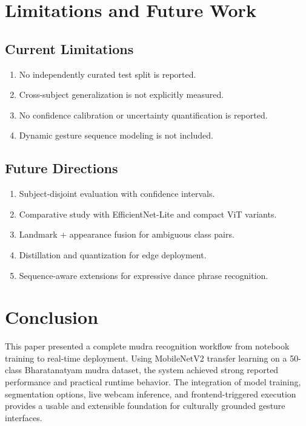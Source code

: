 \documentclass[conference]{IEEEtran}
\begin{document}
\section{Limitations and Future Work}
\subsection{Current Limitations}
\begin{enumerate}
\item No independently curated test split is reported.
\item Cross-subject generalization is not explicitly measured.
\item No confidence calibration or uncertainty quantification is reported.
\item Dynamic gesture sequence modeling is not included.
\end{enumerate}

\subsection{Future Directions}
\begin{enumerate}
\item Subject-disjoint evaluation with confidence intervals.
\item Comparative study with EfficientNet-Lite and compact ViT variants.
\item Landmark + appearance fusion for ambiguous class pairs.
\item Distillation and quantization for edge deployment.
\item Sequence-aware extensions for expressive dance phrase recognition.
\end{enumerate}

\section{Conclusion}
This paper presented a complete mudra recognition workflow from notebook training to real-time deployment. Using MobileNetV2 transfer learning on a 50-class Bharatanatyam mudra dataset, the system achieved strong reported performance and practical runtime behavior. The integration of model training, segmentation options, live webcam inference, and frontend-triggered execution provides a usable and extensible foundation for culturally grounded gesture interfaces.
\end{document}
